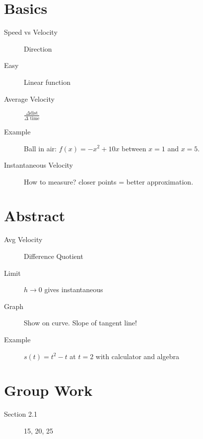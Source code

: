 \documentclass[11pt]{article}
\begin{document}
\drawtitle

\section*{Basics}
\begin{description}
\item[Speed vs Velocity] Direction
\item[Easy] Linear function
\item[Average Velocity] $\displaystyle\frac{\Delta\mbox{
      dist}}{\Delta\mbox{ time}}$
\item[Example] Ball in air: $f(x)=-x^2+10x$ between $x=1$ and $x=5$.
\item[Instantaneous Velocity] How to measure?  closer points = better
  approximation.
\end{description}

\section*{Abstract}
\begin{description}
\item[Avg Velocity] Difference Quotient
\item[Limit] $h\rightarrow 0$ gives instantaneous
\item[Graph] Show on curve.  Slope of tangent line!
\item[Example] $s(t)=t^2-t$ at $t=2$ with calculator and algebra
\end{description}

\section*{Group Work}
\begin{description}
\item[Section 2.1] 15, 20, 25
\end{description}
\end{document}
